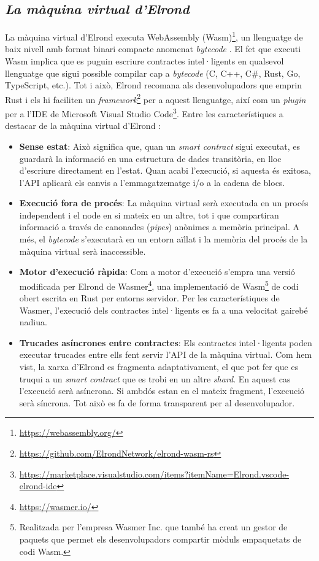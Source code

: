 \documentclass[11pt,a4paper]{article}
\begin{document}
\subsection{\textit{La màquina virtual d'Elrond}}
La màquina virtual d'Elrond executa WebAssembly (Wasm)\footnote{\url{https://webassembly.org/}}, un llenguatge de baix nivell amb format binari compacte anomenat \textit{bytecode} \cite{mozilla2021}. El fet que executi Wasm implica que es puguin escriure contractes intel·ligents en qualsevol llenguatge que sigui possible compilar cap a \textit{bytecode} (C, C++, C\#, Rust, Go, TypeScript, etc.). Tot i això, Elrond recomana als desenvolupadors que emprin Rust i els hi faciliten un \textit{framework}\footnote{\url{https://github.com/ElrondNetwork/elrond-wasm-rs}} per a aquest llenguatge, així com un \textit{plugin} per a l'IDE de Microsoft Visual Studio Code\footnote{\scriptsize\url{https://marketplace.visualstudio.com/items?itemName=Elrond.vscode-elrond-ide}}. Entre les característiques a destacar de la màquina virtual d'Elrond \cite{elrond2022}\cite{mincub2020}:
\begin{itemize}
	\item \textbf{Sense estat}: Això significa que, quan un \textit{smart contract} sigui executat, es guardarà la informació en una estructura de dades transitòria, en lloc d'escriure directament en l'estat. Quan acabi l'execució, si aquesta és exitosa, l'API aplicarà els canvis a l'emmagatzematge i/o a la cadena de blocs. 
	\item \textbf{Execució fora de procés}: La màquina virtual serà executada en un procés independent i el node en si mateix en un altre, tot i que compartiran informació a través de canonades (\textit{pipes}) anònimes a memòria principal.  A més, el \textit{bytecode} s'executarà en un entorn aïllat i la memòria del procés de la màquina virtual serà inaccessible.
	\item \textbf{Motor d'execució ràpida}: Com a motor d'execució s'empra una versió modificada per Elrond de Wasmer\footnote{\url{https://wasmer.io/}}, una implementació de Wasm\footnote{Realitzada per l'empresa Wasmer Inc. que també ha creat un gestor de paquets que permet els desenvolupadors compartir mòduls empaquetats de codi Wasm.} de codi obert escrita en Rust per entorns servidor. Per les característiques de Wasmer, l'execució dels contractes intel·ligents es fa a una velocitat gairebé nadiua.
	\item \textbf{Trucades asíncrones entre contractes}: Els contractes intel·ligents poden executar trucades entre ells fent servir l'API de la màquina virtual. Com hem vist, la xarxa d'Elrond es fragmenta adaptativament, el que pot fer que es truqui a un \textit{smart contract} que es trobi en un altre \textit{shard}. En aquest cas l'execució serà asíncrona. Si ambdós estan en el mateix fragment, l'execució serà síncrona. Tot això es fa de forma transparent per al desenvolupador.
\end{itemize}
\end{document}
